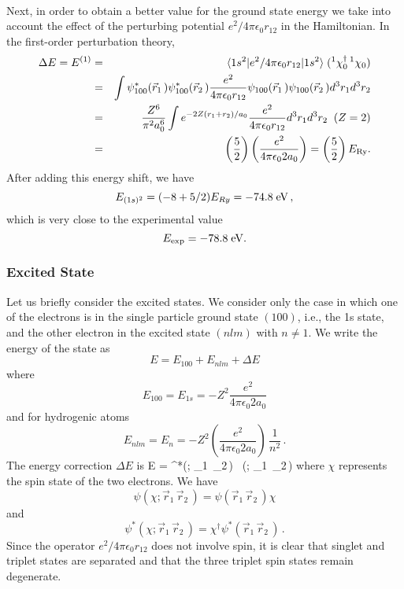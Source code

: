 \paragraph{}
Next, in order to obtain a better value for the ground state energy we take into account the effect of the perturbing potential
$e^2/4\pi\epsilon_0 r_{12}$ in the Hamiltonian. In the first-order perturbation theory, 
\begin{eqnarray}
\Delta E = E^{(1)} & = & \langle 1s^2|e^2/4\pi\epsilon_0 r_{12}|1s^2\rangle \; (^1\chi_0^{\dagger}\, ^1\chi_0) \nonumber \\
& = & \int \psi_{100}^*(\vec{r}_1\,)\psi_{100}^*(\vec{r}_2\,) \frac{e^2}{4\pi\epsilon_0 r_{12}}
\psi_{100}(\vec{r}_1\,)\psi_{100}(\vec{r}_2\,) d^3r_1 d^3r_2 \nonumber \\
& = & \frac{Z^6}{\pi^2 a_0^6}\int e^{-2Z(r_1+r_2)/a_0} \frac{e^2}{4\pi\epsilon_0 r_{12}}d^3r_1 d^3r_2 \;\; (Z=2)\nonumber \\
& = & \left( \frac{5}{2}\right)\left(\frac{e^2}{4\pi\epsilon_0 2a_0} \right) = \left( \frac{5}{2} \right) E_{\rm Ry}.
\end{eqnarray}
After adding this energy shift, we have
\[
E_{(1s)^2} = (-8+5/2)E_{Ry} = -74.8 \; {\rm eV}\, , \]
which is very close to the experimental value
\[ E_{\rm exp} = -78.8 \; {\rm eV}. \]



\subsubsection{Excited State}
Let us briefly consider the excited states. We consider only the case in which one of the electrons is in the single particle ground state $(100)$, i.e., the 1s state, and the other electron in the excited state $(nlm)$ with $n \neq 1$. We write the energy of the state as
\[
E = E_{100} + E_{nlm} + \Delta E \]
where
\[
E_{100}= E_{1s} = - Z^2 \frac{e^2}{4\pi \epsilon_0 2 a_0} \]
and for hydrogenic atoms
\[ E_{nlm} = E_{n} = - Z^2 \left (\frac{e^2}{4\pi \epsilon_0 2 a_0}\right) \, \frac{1}{n^2}\, . \]
The energy correction $\Delta E$ is
\be
\Delta E = \int \psi^*(\chi; _1\, _2\,) \, \psi(\chi; _1\, _2\,)
\ee
where $\chi$ represents the spin state of the two electrons. We have
\[ \psi(\chi; \vec{r}_1\, \vec{r}_2\,) = \psi(\vec{r}_1\, \vec{r}_2\,) \chi \]
and
\[ \psi^*(\chi; \vec{r}_1\, \vec{r}_2\,) = \chi ^{\dagger} \psi^*( \vec{r}_1\, \vec{r}_2\,)\, . \]
Since the operator $e^2/4\pi\epsilon_0 r_{12}$ does not involve spin, it is clear that singlet and triplet states are separated and that the three triplet spin states remain degenerate.

